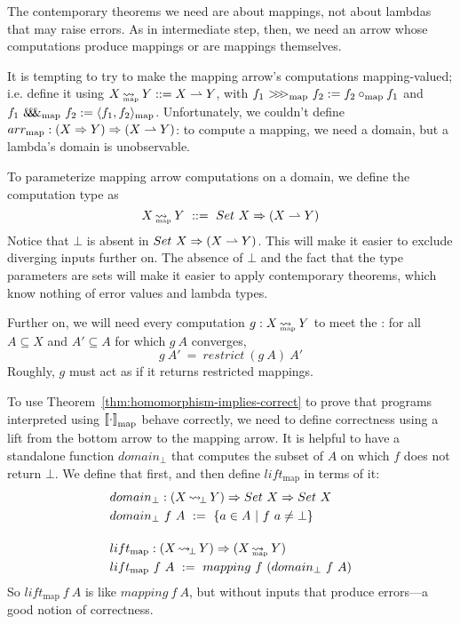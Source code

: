 \documentclass[preprint]{sigplanconf}
\newcommand{\arrow}{\rightsquigarrow}
\newcommand{\pto}{\rightharpoonup}
\newcommand{\arrowlift}{\ensuremath{lift}}
\newcommand{\arrowarr}{\ensuremath{arr}}
\newcommand{\arrowcomp}{\ensuremath{{>}\mspace{-6mu}{>}\mspace{-6mu}{>}}}
\newcommand{\arrowpair}{\ensuremath{\mathit{\&\mspace{-7.5mu}\&\mspace{-7.5mu}\&}}}
\DeclareMathOperator{\botto}{\arrow_{\mspace{-3mu}\bot}}
\newcommand{\map}{_\mathrm{map}}
\DeclareMathOperator{\mapto}{\arrow_{\mspace{-21mu}\map}}
\newcommand{\liftmap}{\arrowlift\map}
\newcommand{\arrmap}{\arrowarr\map}
\newcommand{\compmap}{\arrowcomp\map}
\newcommand{\pairmap}{\arrowpair\map}
\begin{document}
The contemporary theorems we need are about mappings, not about lambdas that may raise errors.
As in intermediate step, then, we need an arrow whose computations produce mappings or are mappings themselves.

It is tempting to try to make the mapping arrow's computations mapping-valued; i.e. define it using $X \mapto Y ::= X \pto Y$, with $f_1~\compmap~f_2 := f_2 \circ\map f_1$ and $f_1~\pairmap~f_2 := \pair{f_1,f_2}\map$.
Unfortunately, we couldn't define $\arrmap : (X \tto Y) \tto (X \pto Y)$: to compute a mapping, we need a domain, but a lambda's domain is unobservable.

To parameterize mapping arrow computations on a domain, we define the  computation type as
\begin{equation}
	X \mapto Y \ ::= \ Set~X \tto (X \pto Y)
\end{equation}
Notice that $\bot$ is absent in $Set~X \tto (X \pto Y)$.
This will make it easier to exclude diverging inputs further on.
The absence of $\bot$ and the fact that the type parameters are sets will make it easier to apply contemporary theorems, which know nothing of error values and lambda types.

Further on, we will need every computation $g : X \mapto Y$ to meet the :
for all $A \subseteq X$ and $A' \subseteq A$ for which $g~A$ converges,
\begin{equation}
	g~A' \ = \ restrict~(g~A)~A'
\label{eqn:mapping-arrow-restriction-law}
\end{equation}
Roughly, $g$ must act as if it returns restricted mappings.

To use Theorem~\ref{thm:homomorphism-implies-correct} to prove that programs interpreted using $\meaningof{\cdot}\map$ behave correctly, we need to define correctness using a lift from the bottom arrow to the mapping arrow.
It is helpful to have a standalone function $domain_\bot$ that computes the subset of $A$ on which $f$ does not return $\bot$.
We define that first, and then define $\liftmap$ in terms of it:
\begin{align}
	&\begin{aligned}
		&domain_\bot : (X \botto Y) \tto Set~X \tto Set~X \\
		&domain_\bot~f~A \ := \ \setb{a \in A}{f~a \neq \bot}
	\end{aligned} \\
\nonumber \\[-6pt]
	&\begin{aligned}
		&\liftmap : (X \botto Y) \tto (X \mapto Y) \\
		&\liftmap~f~A \ := \ mapping~f~(domain_\bot~f~A)
	\end{aligned}
\end{align}
So $\liftmap~f~A$ is like $mapping~f~A$, but without inputs that produce errors---a good notion of correctness.
\end{document}
